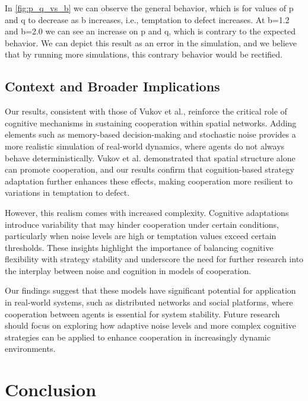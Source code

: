 \documentclass[runningheads]{llncs}
\begin{document}
In \ref{fig:p_q_vs_b} we can observe the general behavior, which is for values of
p and q to decrease as b increases, i.e., temptation to defect increases. At b=1.2
and b=2.0 we can see an increase on p and q, which is contrary to the expected behavior.
We can depict this result as an error in the simulation, and we believe that
by running more simulations, this contrary behavior would be rectified.





\subsection{Context and Broader Implications}
Our results, consistent with those of Vukov et al., reinforce the critical role
of cognitive mechanisms in sustaining cooperation within spatial networks.
Adding elements such as memory-based decision-making and stochastic noise
provides a more realistic simulation of real-world dynamics, where agents do
not always behave deterministically. Vukov et al. \cite{vukov} demonstrated that
spatial structure alone can promote cooperation, and our results confirm
that cognition-based strategy adaptation further enhances these effects, making
cooperation more resilient to variations in temptation to defect.

However, this realism comes with increased complexity. Cognitive adaptations introduce variability that may hinder cooperation under certain conditions, particularly when noise levels are high or temptation values exceed certain thresholds. These insights highlight the importance of balancing cognitive flexibility with strategy stability and underscore the need for further research into the interplay between noise and cognition in models of cooperation.

Our findings suggest that these models have significant potential for application in real-world systems, such as distributed networks and social platforms, where cooperation between agents is essential for system stability.
Future research should focus on exploring how adaptive noise levels and more
complex cognitive strategies can be applied to enhance cooperation in
increasingly dynamic environments.




\section{Conclusion}
\end{document}
